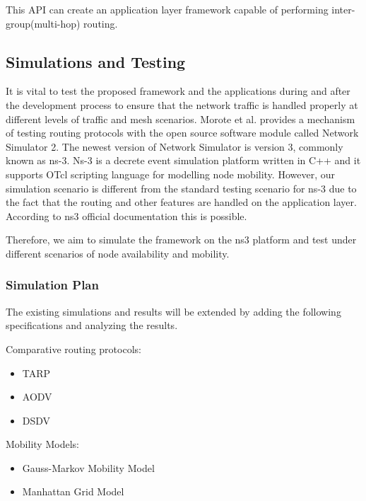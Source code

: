 \vspace{0.1cm}

This API can create an application layer framework capable of performing
inter-group(multi-hop) routing.

\subsection{Simulations and Testing}

It is vital to test the proposed framework and the applications during and
after the development process to ensure that the network traffic is handled
properly at different levels of traffic and mesh scenarios. Morote et al.
provides a mechanism of testing routing protocols with the open source software
module called Network Simulator 2\cite{morote2010}. The newest version of
Network Simulator is version 3, commonly known as ns-3\cite{ns3}. Ns-3 is a
decrete event simulation platform written in C++ and it supports OTcl scripting
language for modelling node mobility\cite{morote2010}. However, our simulation
scenario is different from the standard testing scenario for ns-3 due to the
fact that the routing and other features are handled on the application layer.
According to ns3 official documentation this is possible\cite{ns3}.

Therefore, we aim to simulate the framework on the ns3 platform and test under
different scenarios of node availability and mobility.

\vspace{0.3cm}

\subsubsection{Simulation Plan}
The existing simulations and results will be extended by adding the following
specifications and analyzing the results.

\vspace{0.3cm}

Comparative routing protocols:
\begin{itemize}
    \item TARP
    \item AODV
    \item DSDV
\end{itemize}

\vspace{0.3cm}

Mobility Models:
\begin{itemize}
    \item Gauss-Markov Mobility Model
    \item Manhattan Grid Model
\end{itemize}
